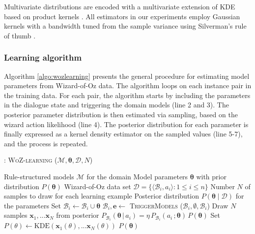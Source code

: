 Multivariate distributions are encoded with a multivariate extension of KDE based on product kernels \citep{Silverman1986}.  All estimators in our experiments employ Gaussian kernels with a bandwidth tuned from the sample variance using Silverman's rule of thumb \citep{Silverman1986}. 


\subsubsection*{Learning algorithm}

Algorithm \ref{algo:wozlearning} presents the general procedure for estimating model parameters from Wizard-of-Oz data.  The algorithm loops on each instance pair in the training data.  For each pair, the algorithm starts by including the parameters in the dialogue state and triggering the domain models (line 2 and 3). The posterior parameter distribution is then estimated via sampling, based on the wizard action likelihood (line 4).  The posterior distribution for each parameter is finally expressed as a kernel density estimator on the sampled values (line 5-7), and the process is repeated. 

\begin{algorithm}[h!]
\caption{: \textsc{WoZ-learning} ($\mathcal{M}, \boldsymbol\theta, \mathcal{D}, N$)}
\begin{algorithmic}[1] \vspace{1mm}
\REQUIRE Rule-structured models $\mathcal{M}$ for the domain
\REQUIRE Model parameters $\boldsymbol\theta$ with prior distribution $P(\boldsymbol\theta)$
\REQUIRE Wizard-of-Oz data set $\mathcal{D} = \{\langle \mathcal{B}_i, a_i \rangle : 1 \leq i  \leq n\}$
\REQUIRE Number $N$ of samples to draw for each learning example
\ENSURE Posterior distribution $P(\boldsymbol\theta \; | \; \mathcal{D})$ for the parameters  \vspace{1mm}
\STATE Set $\mathcal{B}_i \leftarrow \mathcal{B}_i \cup \boldsymbol\theta$
\STATE $\mathcal{B}_i, \mathbf{e} \leftarrow$ \textsc{TriggerModels} ($\mathcal{B}_i, \emptyset,  \mathcal{B}_i$) 
\STATE Draw $N$ samples $\mathbf{x}_1,...\mathbf{x}_N$ from posterior $P_{\mathcal{B}_i}(\boldsymbol\theta \, | \, a_i) = \eta \, P_{\mathcal{B}_i}(a_i\,; \boldsymbol\theta) \, P(\boldsymbol\theta )$
\STATE Set $P(\theta) \leftarrow \mathrm{KDE}(\mathbf{x}_1(\theta),...\mathbf{x}_N(\theta))$
\ENDFOR
\ENDFOR
\RETURN $P(\boldsymbol\theta)$
\end{algorithmic}
\label{algo:wozlearning}
\end{algorithm}


